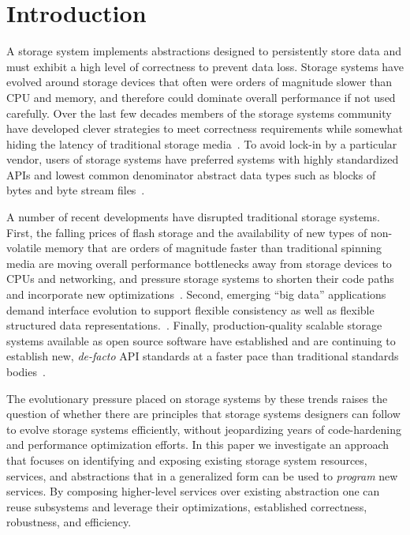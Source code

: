 \documentclass[preprint]{sigplanconf-eurosys}
\begin{document}
\section{Introduction}
\label{introduction}
\label{sec:intro}

A storage system implements abstractions designed to persistently store data
and must exhibit a high level of correctness to prevent data loss.  Storage
systems have evolved around storage devices that often were orders of magnitude
slower than CPU and memory, and therefore could dominate overall performance if
not used carefully. Over the last few decades members of the storage systems
community have developed clever strategies to meet correctness requirements
while somewhat hiding the latency of traditional storage
media~\cite{brewer_disks_2016}. To avoid lock-in by a particular vendor, users
of storage systems have preferred systems with highly standardized APIs and
lowest common denominator abstract data types such as blocks of bytes and byte
stream files~\cite{armbrust_view_2010}.

A number of recent developments have disrupted traditional storage systems.
First, the falling prices of flash storage and the availability of new types of
non-volatile memory that are orders of magnitude faster than traditional
spinning media are moving overall performance bottlenecks away from storage
devices to CPUs and networking, and pressure storage systems to shorten their
code paths and incorporate new
optimizations~\cite{gray_tape_2007,gray_flash_2008}.  Second, emerging ``big
data'' applications demand interface evolution to support flexible consistency
as well as flexible structured data 
representations.~\cite{apache_contributors_parquet_2014}.  Finally, production-quality scalable
storage systems available as open source software have established and are
continuing to establish new, \emph{de-facto} API standards at a faster pace
than traditional standards
bodies~\cite{snia_implementing_2014,linux_foundation_kinetic_2015}.

The evolutionary pressure placed on storage systems by these trends raises the
question of whether there are principles that storage systems designers can
follow to evolve storage systems efficiently, without jeopardizing years of
code-hardening and performance optimization efforts.  In this paper we
investigate an approach that focuses on identifying and exposing existing
storage system resources, services, and abstractions that in a generalized form
can be used to \emph{program} new services. By composing higher-level services
over existing abstraction one can reuse subsystems and leverage their
optimizations, established correctness, robustness, and efficiency. 
\end{document}
